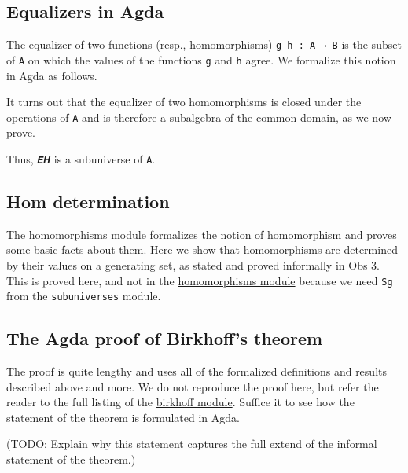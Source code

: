 \documentclass[sigplan,screen]{acmart}
\newcommand\homomorphismsmodule{\href{https://gitlab.com/ualib/ualib.gitlab.io/-/blob/master/homomorphisms.lagda.rst}{homomorphisms module}\xspace}
\newcommand\birkhoffmodule{\href{https://gitlab.com/ualib/ualib.gitlab.io/-/blob/master/birkhoff.lagda.rst}{birkhoff module}\xspace}
\newcommand\homomorphismsmodule{\href{anonymizedLink/homomorphisms.lagda.rst}{homomorphisms module}\xspace}
\newcommand\birkhoffmodule{\href{anonymizedLink/birkhoff.lagda.rst}{birkhoff module}\xspace}
\begin{document}
\subsection{Equalizers in Agda}\label{equalizers-in-agda}
The equalizer of two functions (resp., homomorphisms) \texttt{g\ h\ :\ A\ →\ B} is the subset of \texttt{A} on which the values of the functions \texttt{g} and \texttt{h} agree. We formalize this notion in Agda as follows.
\begin{code}\end{code}
It turns out that the equalizer of two homomorphisms is closed under the operations of \texttt{A} and is therefore a subalgebra of the common domain, as we now prove.
\begin{code}\end{code}
Thus, \texttt{𝑬𝑯} is a subuniverse of \texttt{A}.

\subsection{Hom determination}\label{hom-determination}
The \homomorphismsmodule formalizes the notion of homomorphism and proves some basic facts about them. Here we show that homomorphisms are determined by their values on a generating set, as stated and proved informally in Obs 3. This is proved here, and not in the \homomorphismsmodule because we need \texttt{Sg} from the \texttt{subuniverses} module. %
\begin{code}\end{code}

\subsection{The Agda proof of Birkhoff's theorem}\label{the-agda-proof-of-birkhoffs-theorem}
The proof is quite lengthy and uses all of the formalized definitions and results described above and more.  We do not reproduce the proof here, but refer the reader to the full listing of the \birkhoffmodule.  Suffice it to see how the statement of the theorem is formulated in Agda.
\begin{code}\end{code}

(TODO: Explain why this statement captures the full extend of the informal statement of the theorem.)
\end{document}
